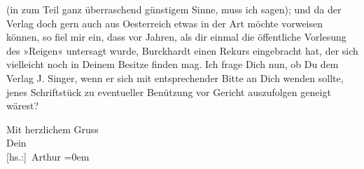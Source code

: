                (in zum Teil ganz überraschend günstigem Sinne, muss ich sagen); und da der Verlag
               doch gern auch aus Oesterreich etwas in der Art
               möchte vorweisen können, so fiel mir ein, dass vor Jahren, als dir einmal die
               öffentliche Vorlesung des »Reigen« untersagt
               wurde, Burckhardt einen Rekurs eingebracht
               hat, der sich vielleicht noch in Deinem Besitze finden mag. Ich frage Dich nun, ob Du
               dem Verlag J. Singer, wenn er sich {\pb}mit entsprechender
               Bitte an Dich wenden sollte, jenes Schriftstück zu eventueller Benützung vor Gericht
               auszufolgen geneigt wärest?\pend
           
\pstart
           Mit herzlichem Gruss{\\[\baselineskip]}Dein{\\[\baselineskip]}\spacefill\mbox{{[}hs.:{]} Arthur}\pend
           \leftskip=0em{}\endnumbering{}  \newcommand{\dateiname}{L02181}\newcommand{\titel}{Arthur Schnitzler an Hermann Bahr, 12. 6. 1914}\newcommand{\editorInnen}{Herausgegeben von Martin Anton Müller}
